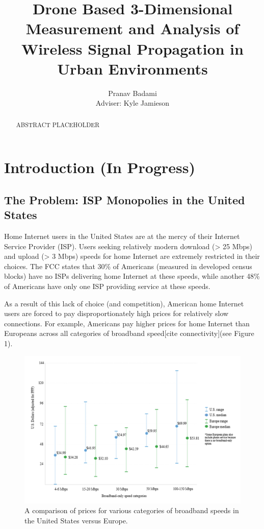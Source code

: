 \documentclass[pageno]{jpaper}
\begin{document}
\title{
Drone Based 3-Dimensional Measurement and Analysis of Wireless Signal Propagation in Urban Environments}

\author{Pranav Badami\\Adviser: Kyle Jamieson}

\date{}
\maketitle

\thispagestyle{empty}
\doublespacing

\begin{abstract}
ABSTRACT PLACEHOLDER
\end{abstract}

\section{Introduction (In Progress)}
\subsection{The Problem: ISP Monopolies in the United States}
Home Internet users in the United States are at the mercy of their Internet Service Provider (ISP). Users seeking relatively modern download (> 25 Mbps) and upload (> 3 Mbps) speeds for home Internet are extremely restricted in their choices. The FCC states that 30\% of Americans (measured in developed census blocks) have no ISPs delivering home Internet at these speeds, while another 48\% of Americans have only one ISP providing service at these speeds\cite{fcc15}.

As a result of this lack of choice (and competition), American home Internet users are forced to pay disproportionately high prices for relatively slow connections. For example, Americans pay higher prices for home Internet than Europeans across all categories of broadband speed[cite connectivity](see Figure 1).

\begin{figure}[h]
	\caption{A comparison of prices for various categories of broadband speeds in the United States versus Europe.}
	\centerline{\includegraphics{comparison}}
\end{figure}
\end{document}
